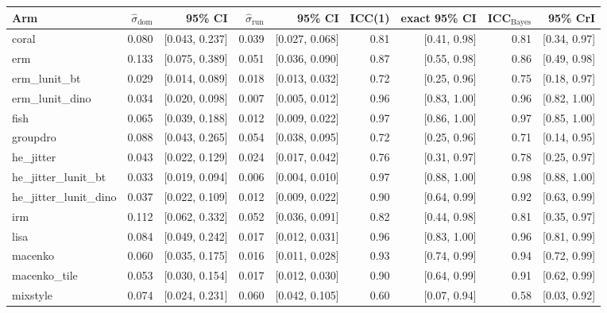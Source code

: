 \begin{tabular}{lrrrrrrrr}
\toprule
Arm & $\hat\sigma_\text{dom}$ & 95\% CI & $\hat\sigma_\text{run}$ & 95\% CI & ICC(1) & exact 95\% CI & ICC$_\text{Bayes}$ & 95\% CrI \\
\midrule
coral & 0.080 & [0.043, 0.237] & 0.039 & [0.027, 0.068] & 0.81 & [0.41, 0.98] & 0.81 & [0.34, 0.97] \\
erm & 0.133 & [0.075, 0.389] & 0.051 & [0.036, 0.090] & 0.87 & [0.55, 0.98] & 0.86 & [0.49, 0.98] \\
erm\_lunit\_bt & 0.029 & [0.014, 0.089] & 0.018 & [0.013, 0.032] & 0.72 & [0.25, 0.96] & 0.75 & [0.18, 0.97] \\
erm\_lunit\_dino & 0.034 & [0.020, 0.098] & 0.007 & [0.005, 0.012] & 0.96 & [0.83, 1.00] & 0.96 & [0.82, 1.00] \\
fish & 0.065 & [0.039, 0.188] & 0.012 & [0.009, 0.022] & 0.97 & [0.86, 1.00] & 0.97 & [0.85, 1.00] \\
groupdro & 0.088 & [0.043, 0.265] & 0.054 & [0.038, 0.095] & 0.72 & [0.25, 0.96] & 0.71 & [0.14, 0.95] \\
he\_jitter & 0.043 & [0.022, 0.129] & 0.024 & [0.017, 0.042] & 0.76 & [0.31, 0.97] & 0.78 & [0.25, 0.97] \\
he\_jitter\_lunit\_bt & 0.033 & [0.019, 0.094] & 0.006 & [0.004, 0.010] & 0.97 & [0.88, 1.00] & 0.98 & [0.88, 1.00] \\
he\_jitter\_lunit\_dino & 0.037 & [0.022, 0.109] & 0.012 & [0.009, 0.022] & 0.90 & [0.64, 0.99] & 0.92 & [0.63, 0.99] \\
irm & 0.112 & [0.062, 0.332] & 0.052 & [0.036, 0.091] & 0.82 & [0.44, 0.98] & 0.81 & [0.35, 0.97] \\
lisa & 0.084 & [0.049, 0.242] & 0.017 & [0.012, 0.031] & 0.96 & [0.83, 1.00] & 0.96 & [0.81, 0.99] \\
macenko & 0.060 & [0.035, 0.175] & 0.016 & [0.011, 0.028] & 0.93 & [0.74, 0.99] & 0.94 & [0.72, 0.99] \\
macenko\_tile & 0.053 & [0.030, 0.154] & 0.017 & [0.012, 0.030] & 0.90 & [0.64, 0.99] & 0.91 & [0.62, 0.99] \\
mixstyle & 0.074 & [0.024, 0.231] & 0.060 & [0.042, 0.105] & 0.60 & [0.07, 0.94] & 0.58 & [0.03, 0.92] \\

\end{tabular}
